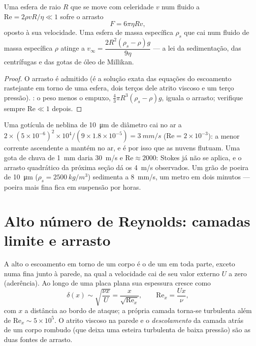 \begin{proposition}\label{prop:b2:viscous-flows:stokes}
Uma esfera de raio $R$ que se move com celeridade $v$ num fluido a
$\mathrm{Re} = 2\rho vR/\eta \ll 1$ sofre o arrasto
\[
F = 6\pi\eta Rv ,
\]
oposto à sua velocidade. Uma esfera de massa específica $\rho_s$ que cai num fluido
de massa específica $\rho$ atinge a \emph{} $v_\infty =
\dfrac{2R^2(\rho_s - \rho)g}{9\eta}$ --- a lei da sedimentação, das
centrífugas e das gotas de óleo de Millikan.
\end{proposition}

\begin{proof}
O arrasto é admitido (é a solução exata das equações do escoamento
rastejante em torno de uma esfera, dois terços dele atrito viscoso e um terço
pressão). : o peso menos o empuxo, $\tfrac43\pi R^3(\rho_s -
\rho)g$, iguala o arrasto; verifique sempre $\mathrm{Re} \ll 1$ depois.
\end{proof}

\begin{example}\label{ex:b2:viscous-flows:fog}
Uma gotícula de neblina de \qty{10}{\micro m} de diâmetro cai no ar a $2 \times (5 \times
10^{-6})^2 \times 10^4/(9 \times 1.8 \times 10^{-5}) = \qty{3}{mm/s}$ ($\mathrm{Re} = 2 \times
10^{-3}$): a menor corrente ascendente a mantém no ar, e é por isso que as nuvens
flutuam. Uma gota de chuva de \qty{1}{mm} daria \qty{30}{m/s} e $\mathrm{Re} \approx 2000$:
Stokes já não se aplica, e o arrasto quadrático da próxima seção
dá os \qty{4}{m/s} observados. Um grão de poeira de \qty{10}{\micro m} ($\rho_s =
\qty{2500}{kg/m^3}$) sedimenta a \qty{8}{mm/s}, um metro em dois minutos ---
poeira mais fina fica em suspensão por horas.
\end{example}

\section{Alto número de Reynolds: camadas limite e arrasto}

\begin{proposition}\label{prop:b2:viscous-flows:bl}
A alto  o escoamento em torno de um corpo é o de um  em toda parte, exceto numa fina \emph{} junto à parede,
na qual a velocidade cai de seu valor externo $U$ a zero (aderência).
Ao longo de uma placa plana sua espessura cresce como
\[
\delta(x) \sim \sqrt{\frac{\nu x}{U}} = \frac{x}{\sqrt{\mathrm{Re}_x}} ,
\qquad \mathrm{Re}_x = \frac{Ux}{\nu} ,
\]
com $x$ a distância ao bordo de ataque; a própria camada torna-se
turbulenta além de $\mathrm{Re}_x \sim 5 \times 10^5$. O atrito viscoso na
parede e o \emph{descolamento} da camada atrás de um corpo rombudo (que
deixa uma esteira turbulenta de baixa pressão) são as duas fontes de arrasto.
\end{proposition}

